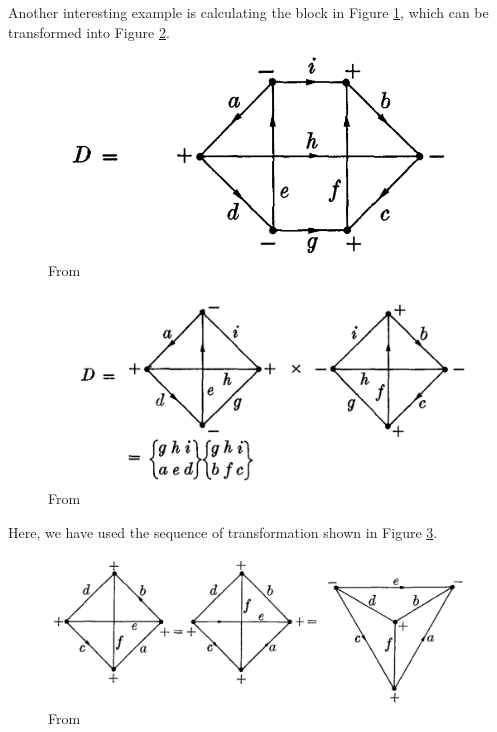 \documentclass[11pt]{article}
\begin{document}
\begin{appendices}
Another interesting example is calculating the block in Figure \ref{fig:block_ex}, which can be transformed into Figure \ref{fig:block_ex1}.
\begin{figure}[!htb]
	\centering
	\includegraphics[scale=0.7]{blocks_ex1}
	\caption{From \cite{angular_momentum}}
	\label{fig:block_ex}
\end{figure}
\begin{figure}[!htb]
	\centering
	\includegraphics[scale=0.7]{blocks_ex2}
	\caption{From \cite{angular_momentum}}
	\label{fig:block_ex1}
\end{figure}
Here, we have used the sequence of transformation shown in Figure \ref{fig:justify}.
\begin{figure}[!htb]
	\centering
	\includegraphics[scale=0.7]{transformation}
	\caption{From \cite{angular_momentum}}
	\label{fig:justify}
\end{figure}



\end{appendices}
\end{document}
